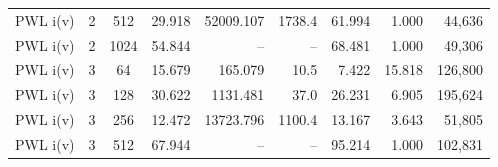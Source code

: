 \begin{landscape}
{\begin{longtable}{lccrrrrrr}
PWL i(v) & 2 & 512 & 29.918 & 52009.107 & 1738.4 & 61.994 & 1.000 & 44,636\\
PWL i(v) & 2 & 1024 & 54.844 & -- & -- & 68.481 & 1.000 & 49,306\\
PWL i(v) & 3 & 64 & 15.679 & 165.079 & 10.5 & 7.422 & 15.818 & 126,800\\
PWL i(v) & 3 & 128 & 30.622 & 1131.481 & 37.0 & 26.231 & 6.905 & 195,624\\
PWL i(v) & 3 & 256 & 12.472 & 13723.796 & 1100.4 & 13.167 & 3.643 & 51,805\\
PWL i(v) & 3 & 512 & 67.944 & -- & -- & 95.214 & 1.000 & 102,831\\
\end{longtable}
}
\end{landscape}
